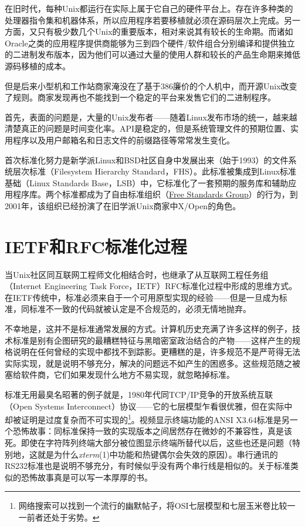 \documentclass[12pt,oneside]{book}
\begin{document}
\begin{common-format}
在旧时代，每种Unix都运行在实际上属于它自己的硬件平台上。存在许多种类的处理器指令集和机器体系，所以应用程序若要移植就必须在源码层次上完成。另一方面，又只有极少数几个Unix的重要版本，相对来说其有较长的生命期。而诸如Oracle之类的应用程序提供商能够为三到四个硬件/软件组合分别编译和提供独立的二进制发布版本，因为他们可以通过大量的使用人群和较长的产品生命期来摊低源码移植的成本。

但是后来小型机和工作站商家淹没在了基于386廉价的个人机中，而开源Unix改变了规则。商家发现再也不能找到一个稳定的平台来发售它们的二进制程序。

首先，表面的问题是，大量的Unix发布者——随着Linux发布市场的统一，越来越清楚真正的问题是时间变化率。API是稳定的，但是系统管理文件的预期位置、实用程序以及用户邮箱名和日志文件的前缀路径等常常发生变化。

首次标准化努力是新学派Linux和BSD社区自身中发展出来（始于1993）的文件系统层次标准（Filesystem Hierarchy Standard，FHS）。此标准被集成到Linux标准基础（Linux Standards Base，LSB）中，它标准化了一套预期的服务库和辅助应用程序库。两个标准都成为了自由标准组织（\href{http://www.freestandards.org/}{Free Standards Group}）的行为，到2001年，该组织已经扮演了在旧学派Unix商家中X/Open的角色。

\section{IETF和RFC标准化过程}
当Unix社区同互联网工程师文化相结合时，也继承了从互联网工程任务组（Internet Engineering Task Force，IETF）RFC标准化过程中形成的思维方式。在IETF传统中，标准必须来自于一个可用原型实现的经验——但是一旦成为标准，同标准不一致的代码就被认定是不合规范的，必须无情地抛弃。

不幸地是，这并不是标准通常发展的方式。计算机历史充满了许多这样的例子，技术标准是别有企图研究的最糟糕特征与黑暗密室政治结合的产物——这样产生的规格说明在任何曾经的实现中都找不到踪影。更糟糕的是，许多规范不是严苛得无法实际实现，就是说明不够充分，解决的问题远不如产生的困惑多。这些规范随之被塞给软件商，它们如果发现什么地方不易实现，就忽略掉标准。

标准无用最臭名昭著的例子就是，1980年代同TCP/IP竞争的开放系统互联（Open Systems  Interconnect）协议——它的七层模型乍看很优雅，但在实际中却被证明是过度复杂而不可实现的\footnote{网络搜索可以找到一个流行的幽默帖子，将OSI七层模型和七层玉米卷比较一一前者还处于劣势。}。视频显示终端功能的ANSI X3.64标准是另一个恐怖故事：同标准保持一致的实现版本之间居然存在微妙的不兼容性，真是该死。即使在字符阵列终端大部分被位图显示终端所替代以后，这些也还是问题（特别地，这就是为什么\textit{xterm}(1)中功能和热键偶尔会失效的原因）。串行通讯的RS232标准也是说明不够充分，有时候似乎没有两个串行线是相似的。关于标准类似的恐怖故事真是可以写一本厚厚的书。


\end{common-format}
\end{document}
